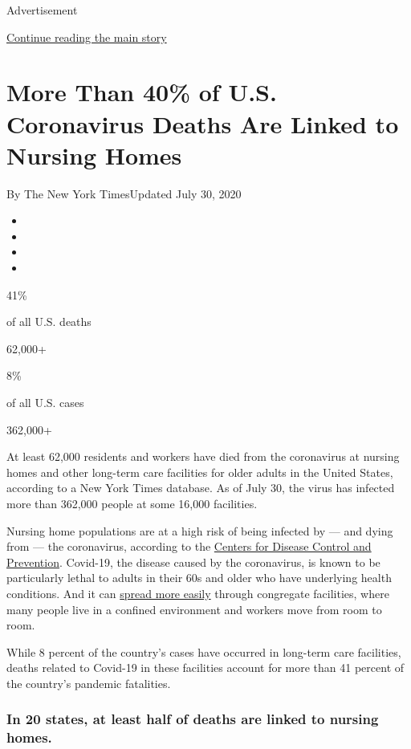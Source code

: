 Advertisement

\protect\hyperlink{after-top}{Continue reading the main story}

\hypertarget{more-than-40-of-us-coronavirus-deaths-are-linked-to-nursing-homes}{%
\section{More Than 40\% of U.S. Coronavirus Deaths Are Linked to Nursing
Homes}\label{more-than-40-of-us-coronavirus-deaths-are-linked-to-nursing-homes}}

By The New York TimesUpdated July 30, 2020

\begin{itemize}
\item
\item
\item
\item
\end{itemize}

41\%

of all U.S. deaths

62,000+

8\%

of all U.S. cases

362,000+

At least 62,000 residents and workers have died from the coronavirus at
nursing homes and other long-term care facilities for older adults in
the United States, according to a New York Times database. As of July
30, the virus has infected more than 362,000 people at some 16,000
facilities.

Nursing home populations are at a high risk of being infected by --- and
dying from --- the coronavirus, according to the
\href{https://www.cdc.gov/coronavirus/2019-ncov/hcp/long-term-care.html}{Centers
for Disease Control and Prevention}. Covid-19, the disease caused by the
coronavirus, is known to be particularly lethal to adults in their 60s
and older who have underlying health conditions. And it can
\href{https://www.nytimes.com/2020/04/17/us/coronavirus-nursing-homes.html}{spread
more easily} through congregate facilities, where many people live in a
confined environment and workers move from room to room.

While 8 percent of the country's cases have occurred in long-term care
facilities, deaths related to Covid-19 in these facilities account for
more than 41 percent of the country's pandemic fatalities.

\hypertarget{in-20-states-at-least-half-of-deaths-are-linked-to-nursing-homes}{%
\subsubsection{In 20 states, at least half of deaths are linked to
nursing
homes.}\label{in-20-states-at-least-half-of-deaths-are-linked-to-nursing-homes}}

